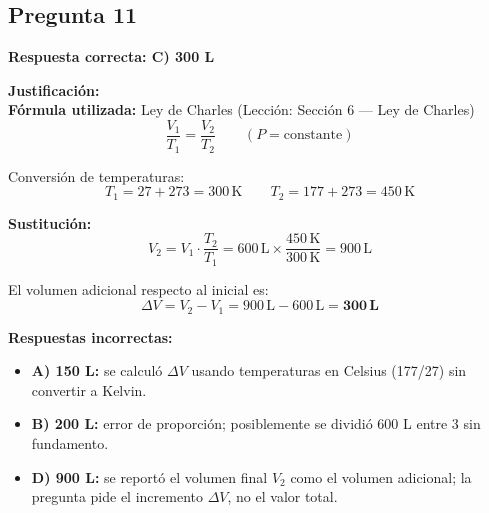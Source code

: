 \begin{respuestabox}
\subsection{Pregunta 11}
\textcolor{verdecorrecto}{\textbf{Respuesta correcta: C) 300 L}}

\textbf{Justificación:}\\
\textbf{Fórmula utilizada:} Ley de Charles (Lección: Sección 6 --- Ley de Charles)
$$\frac{V_1}{T_1} = \frac{V_2}{T_2} \qquad (P = \text{constante})$$

Conversión de temperaturas:
$$T_1 = 27 + 273 = 300\,\text{K} \qquad T_2 = 177 + 273 = 450\,\text{K}$$

\textbf{Sustitución:}
$$V_2 = V_1 \cdot \frac{T_2}{T_1} = 600\,\text{L} \times \frac{450\,\text{K}}{300\,\text{K}} = 900\,\text{L}$$

El volumen adicional respecto al inicial es:
$$\Delta V = V_2 - V_1 = 900\,\text{L} - 600\,\text{L} = \mathbf{300\,\text{L}}$$

\textbf{Respuestas incorrectas:}
\begin{itemize}
    \item \textbf{A) 150 L:} se calculó $\Delta V$ usando temperaturas en Celsius (177/27) sin convertir a Kelvin.
    \item \textbf{B) 200 L:} error de proporción; posiblemente se dividió 600 L entre 3 sin fundamento.
    \item \textbf{D) 900 L:} se reportó el volumen final $V_2$ como el volumen adicional; la pregunta pide el incremento $\Delta V$, no el valor total.
\end{itemize}
\end{respuestabox}

